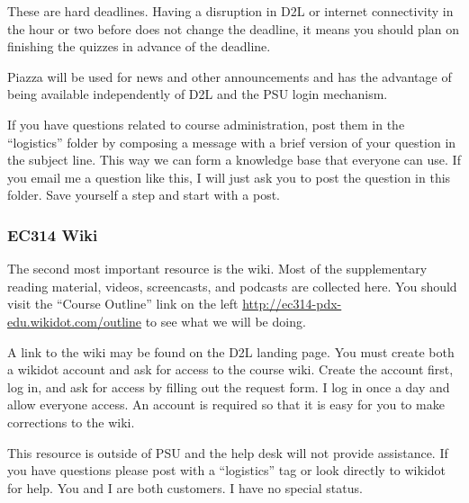 \documentclass[letterpaper,10pt]{article}
\begin{document}
These are hard deadlines.  Having a disruption in D2L or internet connectivity in the hour or two before does not change the deadline, it means you should plan on finishing the quizzes in advance of the deadline.

Piazza will be used for news and other announcements and has the advantage of being available independently of D2L and the PSU login mechanism.  

If you have questions related to course administration, post them in
the ``logistics'' folder by
composing a message with a brief version of your question in the
subject line. This way we can form a knowledge base that everyone can
use.  If you email me a question like this, I will just ask you to
post the question in this folder.  Save yourself a step and start with a post.



\subsubsection{EC314 Wiki}
The second most important resource is the wiki.  Most of the
supplementary reading material, videos, screencasts, and podcasts are
collected here. You should visit the ``Course Outline'' link on the
left \url{http://ec314-pdx-edu.wikidot.com/outline} to see what we will be
doing.

A link to the wiki may be found on the D2L landing page.  You must create both a wikidot account and ask for access to the course wiki.  Create the account first, log in, and ask for access by filling out the request form.  I log in once a day and allow everyone access.  An account is required so that it is easy for you to make corrections to the wiki.

This resource is outside of PSU and the help desk will not provide
assistance.  If you have questions please post with a  
``logistics'' tag or look directly to wikidot
for help.  You and I are both customers. I have no special status.
\end{document}
